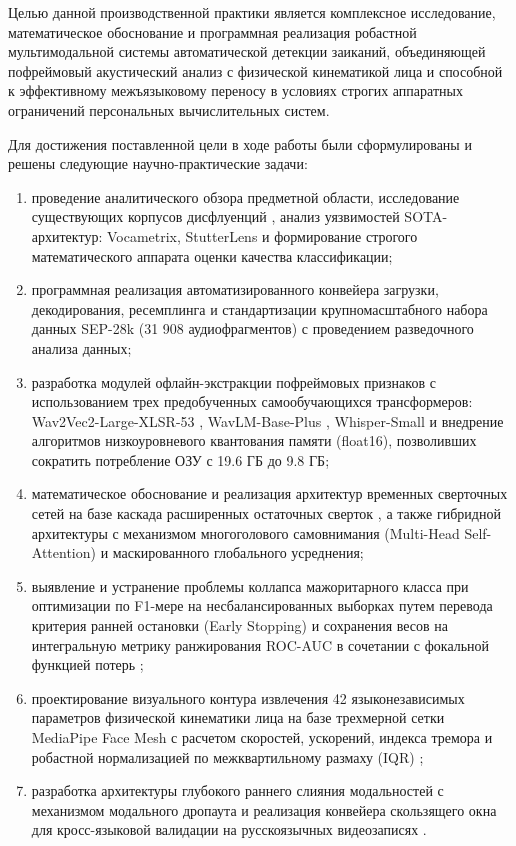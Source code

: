 \documentclass[a4paper,14pt]{extarticle}
\begin{document}
	Целью данной производственной практики является комплексное исследование, математическое обоснование и программная реализация робастной мультимодальной системы автоматической детекции заиканий, объединяющей пофреймовый акустический анализ с физической кинематикой лица и способной к эффективному межъязыковому переносу в условиях строгих аппаратных ограничений персональных вычислительных систем.
	
	Для достижения поставленной цели в ходе работы были сформулированы и решены следующие научно-практические задачи:
	\begin{enumerate}
		\item проведение аналитического обзора предметной области, исследование существующих корпусов дисфлуенций \cite{sep28k}, анализ уязвимостей SOTA-архитектур: Vocametrix, StutterLens \cite{ivankin} и формирование строгого математического аппарата оценки качества классификации;
		\item программная реализация автоматизированного конвейера загрузки, декодирования, ресемплинга и стандартизации крупномасштабного набора данных SEP-28k (31 908 аудиофрагментов) \cite{sep28k} с проведением разведочного анализа данных;
		\item разработка модулей офлайн-экстракции пофреймовых признаков с использованием трех предобученных самообучающихся трансформеров: Wav2Vec2-Large-XLSR-53 \cite{wav2vec}, WavLM-Base-Plus \cite{wavlm}, Whisper-Small \cite{whisper} и внедрение алгоритмов низкоуровневого квантования памяти (float16), позволивших сократить потребление ОЗУ с 19.6 ГБ до 9.8 ГБ;
		\item математическое обоснование и реализация архитектур временных сверточных сетей на базе каскада расширенных остаточных сверток \cite{tcn}, а также гибридной архитектуры с механизмом многоголового самовнимания (Multi-Head Self-Attention) и маскированного глобального усреднения;
		\item выявление и устранение проблемы коллапса мажоритарного класса при оптимизации по F1-мере на несбалансированных выборках путем перевода критерия ранней остановки (Early Stopping) и сохранения весов на интегральную метрику ранжирования ROC-AUC в сочетании с фокальной функцией потерь \cite{focalloss};
		\item проектирование визуального контура извлечения 42 языконезависимых параметров физической кинематики лица на базе трехмерной сетки MediaPipe Face Mesh \cite{mediapipe} с расчетом скоростей, ускорений, индекса тремора и робастной нормализацией по межквартильному размаху (IQR) \cite{ivankin};
		\item разработка архитектуры глубокого раннего слияния модальностей \cite{tcn} с механизмом модального дропаута и реализация конвейера скользящего окна для кросс-языковой валидации на русскоязычных видеозаписях \cite{ivankin}.
	\end{enumerate}
	
\end{document}

